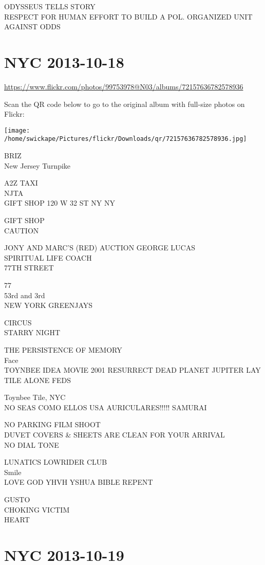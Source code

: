 \documentclass[10pt,letterpaper]{article}
\begin{document}
ODYSSEUS TELLS STORY\\
RESPECT FOR HUMAN EFFORT TO BUILD A POL. ORGANIZED UNIT AGAINST ODDS
\pagebreak

\section*{NYC 2013-10-18}

\url{https://www.flickr.com/photos/99753978@N03/albums/72157636782578936}

Scan the QR code below to go to the original album with full-size photos on Flickr:

\texttt{[image: /home/swickape/Pictures/flickr/Downloads/qr/72157636782578936.jpg]}
\pagebreak

BRIZ\\
New Jersey Turnpike

A2Z TAXI\\
NJTA\\
GIFT SHOP 120 W 32 ST NY NY

GIFT SHOP\\
CAUTION

JONY AND MARC'S (RED) AUCTION GEORGE LUCAS\\
SPIRITUAL LIFE COACH\\
77TH STREET

77\\
53rd and 3rd\\
NEW YORK GREENJAYS

CIRCUS\\
STARRY NIGHT

THE PERSISTENCE OF MEMORY\\
Face\\
TOYNBEE IDEA MOVIE 2001 RESURRECT DEAD PLANET JUPITER LAY TILE ALONE FEDS

Toynbee Tile, NYC\\
NO SEAS COMO ELLOS USA AURICULARES!!!!! SAMURAI

NO PARKING FILM SHOOT\\
DUVET COVERS \& SHEETS ARE CLEAN FOR YOUR ARRIVAL\\
NO DIAL TONE

LUNATICS LOWRIDER CLUB\\
Smile\\
LOVE GOD YHVH YSHUA BIBLE REPENT

GUSTO\\
CHOKING VICTIM\\
HEART
\pagebreak

\section*{NYC 2013-10-19}
\end{document}
